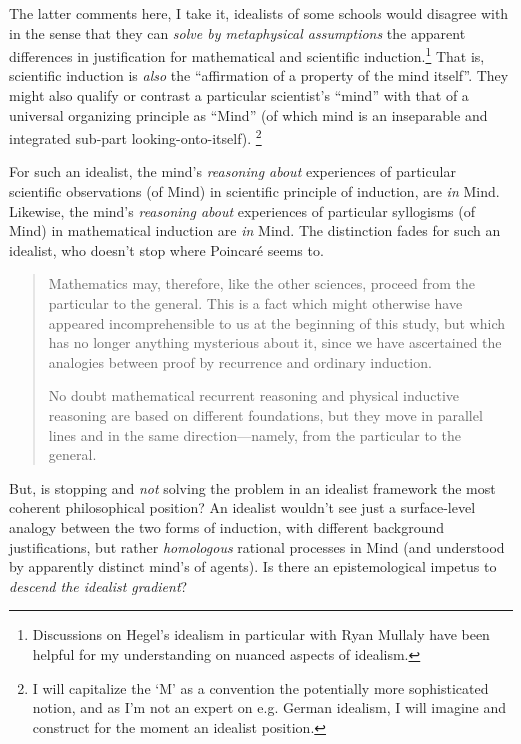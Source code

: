 \documentclass{article}
\begin{document}
The latter comments here, I take it, idealists of some schools would disagree with in the sense that they can \emph{solve by metaphysical assumptions} the apparent differences in justification for mathematical and scientific induction.\footnote{Discussions on Hegel's idealism in particular with Ryan Mullaly have been helpful for my understanding on nuanced aspects of idealism.}  That is, scientific induction is \emph{also} the ``affirmation of a property of the mind itself''.  They might also qualify or contrast a particular scientist's ``mind'' with that of a universal organizing principle as ``Mind'' (of which mind is an inseparable and integrated sub-part looking-onto-itself).  \footnote{I will capitalize the `M' as a convention the potentially more sophisticated notion, and as I'm not an expert on e.g. German idealism, I will imagine and construct for the moment an idealist position.}

For such an idealist, the mind's \emph{reasoning about} experiences of particular scientific observations (of Mind) in scientific principle of induction, are \emph{in} Mind.  Likewise, the mind's \emph{reasoning about} experiences of particular syllogisms (of Mind) in mathematical induction are \emph{in} Mind.  The distinction fades for such an idealist, who doesn't stop where Poincar\'e seems to.  

\begin{quote}
    Mathematics may, therefore, like the other sciences, proceed from the particular to the general.  This is a fact which might otherwise have appeared incomprehensible to us at the beginning of this study, but which has no longer anything mysterious about it, since we have ascertained the analogies between proof by recurrence and ordinary induction.
    
    No doubt mathematical recurrent reasoning and physical inductive reasoning are based on different foundations, but they move in parallel lines and in the same direction---namely, from the particular to the general.
    
    \citep[p. 14]{Poincare1952}
\end{quote}

But, is stopping and \emph{not} solving the problem in an idealist framework the most coherent philosophical position?  An idealist wouldn't see just a surface-level analogy between the two forms of induction, with different background justifications, but rather \emph{homologous} rational processes in Mind (and understood by apparently distinct mind's of agents).  Is there an epistemological impetus to \emph{descend the idealist gradient}?
\end{document}

